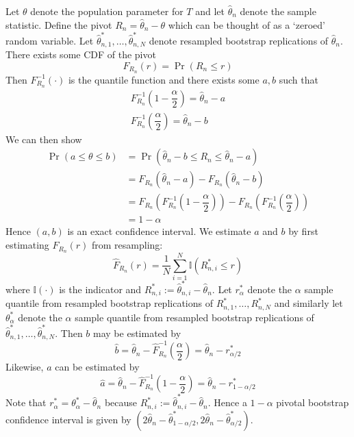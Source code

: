 \documentclass[11pt]{report} %
\begin{document}
Let $\theta$ denote the population parameter for $T$ and let $\hat{\theta}_{n}$ denote the sample statistic. Define the pivot $R_{n} = \hat{\theta}_{n} - \theta$ which can be thought of as a `zeroed' random variable. Let $\hat{\theta}_{n, 1}^{*}, \dots, \hat{\theta}_{n, N}^{*}$ denote resampled bootstrap replications of $\hat{\theta}_{n}$. There exists some CDF of the pivot
\begin{equation}
F_{R_{n}}\left(r\right) = \operatorname{Pr}\left(R_{n} \leq r\right)
\end{equation}
Then $F_{R_{n}}^{-1}\left(\cdot\right)$ is the quantile function and there exists some $a, b$ such that
\begin{gather}
F_{R_{n}}^{-1}\left(1 - \dfrac{\alpha}{2}\right) = \hat{\theta}_{n} - a \\
F_{R_{n}}^{-1}\left(\dfrac{\alpha}{2}\right) = \hat{\theta}_{n} - b
\end{gather}
We can then show
\begin{align}
\operatorname{Pr}\left(a \leq \theta \leq b\right) &= \operatorname{Pr}\left(\hat{\theta}_{n} - b \leq R_{n} \leq \hat{\theta}_{n} - a\right) \\
&= F_{R_{n}}\left(\hat{\theta}_{n} - a\right) - F_{R_{n}}\left(\hat{\theta}_{n} - b\right) \\
&= F_{R_{n}}\left(F_{R_{n}}^{-1}\left(1 - \dfrac{\alpha}{2}\right)\right) - F_{R_{n}}\left(F_{R_{n}}^{-1}\left(\dfrac{\alpha}{2}\right)\right) \\
&= 1 - \alpha
\end{align}
Hence $\left(a, b\right)$ is an exact confidence interval. We estimate $a$ and $b$ by first estimating $F_{R_{n}}\left(r\right)$ from resampling:
\begin{equation}
\hat{F}_{R_{n}}\left(r\right) = \dfrac{1}{N}\sum_{i = 1}^{N}\mathbb{I}\left(R_{n, i}^{*} \leq r\right)
\end{equation}
where $\mathbb{I}\left(\cdot\right)$ is the indicator and $R_{n, i}^{*} := \hat{\theta}_{n, i}^{*} - \hat{\theta}_{n}$. Let $r_{\alpha}^{*}$ denote the $\alpha$ sample quantile from resampled bootstrap replications of $R_{n, 1}^{*}, \dots, R_{n, N}^{*}$ and similarly let $\theta_{\alpha}^{*}$ denote the $\alpha$ sample quantile from resampled bootstrap replications of $\hat{\theta}_{n, 1}^{*}, \dots, \hat{\theta}_{n, N}^{*}$. Then $b$ may be estimated by
\begin{equation}
\hat{b} = \hat{\theta}_{n} - \hat{F}_{R_{n}}^{-1}\left(\dfrac{\alpha}{2}\right) = \hat{\theta}_{n} - r_{\alpha/2}^{*}
\end{equation}
Likewise, $a$ can be estimated by
\begin{equation}
\hat{a} = \hat{\theta}_{n} - \hat{F}_{R_{n}}^{-1}\left(1 - \dfrac{\alpha}{2}\right) = \hat{\theta}_{n} - r_{1 - \alpha/2}^{*}
\end{equation}
Note that $r_{\alpha}^{*} = \theta_{\alpha}^{*} - \hat{\theta}_{n}$ because  $R_{n, i}^{*} := \hat{\theta}_{n, i}^{*} - \hat{\theta}_{n}$. Hence a $1 - \alpha$ pivotal bootstrap confidence interval is given by $\left(2\hat{\theta}_{n} - \hat{\theta}_{1 - \alpha/2}^{*}, 2\hat{\theta}_{n} - \hat{\theta}_{ \alpha/2}^{*}\right)$.
\end{document}
